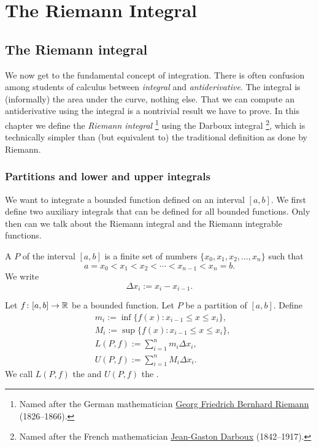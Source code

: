 \chapter{The Riemann Integral} \label{int:chapter}


\section{The Riemann integral}
\label{sec:rint}


We now get to the fundamental concept of integration.  There is
often confusion among students of
calculus between \emph{integral} and \emph{antiderivative}.
The integral is (informally) the area under the curve, nothing else.
That we can compute an antiderivative using the integral is a nontrivial
result we have to prove.  
In this chapter we define the \emph{Riemann integral}%
\footnote{Named after the German mathematician
\href{http://en.wikipedia.org/wiki/Riemann}{Georg Friedrich Bernhard Riemann}
(1826--1866).}
using the Darboux integral%
\footnote{Named after the French mathematician
\href{http://en.wikipedia.org/wiki/Darboux}{Jean-Gaston Darboux} (1842--1917).},
which is technically simpler than (but equivalent to) the traditional
definition as done by Riemann.

\subsection{Partitions and lower and upper integrals}

We want to integrate a bounded function defined on an interval $[a,b]$.
We first define two auxiliary integrals that can be defined for all
bounded functions.  Only then can we talk about the Riemann integral and
the Riemann integrable functions.

\begin{defn}
A \emph{} $P$ of the interval $[a,b]$ is
a finite set of numbers $\{ x_0,x_1,x_2,\ldots,x_n \}$ such that
\begin{equation*}
a = x_0 < x_1 < x_2 < \cdots < x_{n-1} < x_n = b .
\end{equation*}
We write
\begin{equation*}
\Delta x_i := x_i - x_{i-1} .
\end{equation*}

\medskip

Let $f \colon [a,b] \to {\mathbb{R}}$ be a bounded function.  Let $P$ be a partition of
$[a,b]$.
Define
\begin{align*}
& m_i := \inf \{ f(x) : x_{i-1} \leq x \leq x_i \} , \\
& M_i := \sup \{ f(x) : x_{i-1} \leq x \leq x_i \} , \\
& L(P,f) :=
\sum_{i=1}^n m_i \Delta x_i , \\
& U(P,f) :=
\sum_{i=1}^n M_i \Delta x_i .
\end{align*}
We call $L(P,f)$ the \emph{} and
$U(P,f)$ the \emph{}.
\end{defn}


